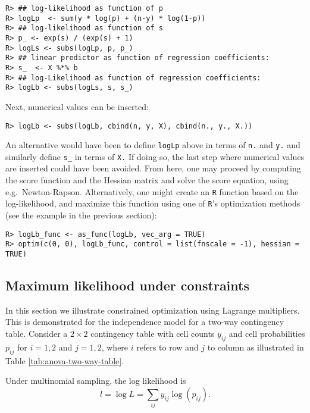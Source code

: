 \begin{verbatim}
R> ## log-likelihood as function of p
R> logLp  <- sum(y * log(p) + (n-y) * log(1-p))
R> ## log-likelihood as function of s
R> p_ <- exp(s) / (exp(s) + 1)
R> logLs <- subs(logLp, p, p_)
R> ## linear predictor as function of regression coefficients:
R> s_  <- X %*% b
R> ## log-Likelihood as function of regression coefficients:
R> logLb <- subs(logLs, s, s_)
\end{verbatim}

Next, numerical values can be inserted:

\begin{verbatim}
R> logLb <- subs(logLb, cbind(n, y, X), cbind(n., y., X.))
\end{verbatim}

An alternative would have been to define \texttt{logLp} above in terms of
\texttt{n.} and \texttt{y.} and similarly define \texttt{s\_} in terms of \texttt{X.} If doing so,
the last step where numerical values are inserted could have been
avoided. From here, one may proceed by computing the score function
and the Hessian matrix and solve the score equation, using
e.g.~Newton-Rapson. Alternatively, one might create an \texttt{R} function
based on the log-likelihood, and maximize this function using one of
\texttt{R}'s optimization methods (see the example in the previous section):

\begin{verbatim}
R> logLb_func <- as_func(logLb, vec_arg = TRUE)
R> optim(c(0, 0), logLb_func, control = list(fnscale = -1), hessian = TRUE)
\end{verbatim}

\hypertarget{maximum-likelihood-under-constraints}{%
\subsection{Maximum likelihood under constraints}\label{maximum-likelihood-under-constraints}}

In this section we illustrate constrained optimization using Lagrange multipliers.
This is demonstrated for the independence model for a two-way contingency table.
Consider a \(2 \times 2\) contingency table with cell
counts \(y_{ij}\) and cell probabilities \(p_{ij}\) for \(i=1,2\) and \(j=1,2\),
where \(i\) refers to row and \(j\) to column as
illustrated in Table \ref{tab:anova-two-way-table}.

Under multinomial sampling, the log likelihood is
\[
 l = \log L = \sum_{ij} y_{ij} \log(p_{ij}).
\]


